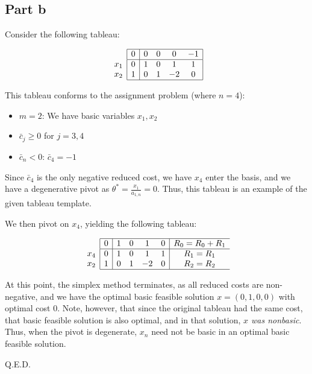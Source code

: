 \subsection*{Part b}

Consider the following tableau:

$$
\begin{array}{c}
\\
x_1 \\
x_2 \\ 
\end{array}
\begin{array}{|c|cccc|}
\hline
  0 & 0 & 0 & 0 & -1 \\ \hline
  0 & 1 & 0 & 1 & 1 \\
  1 & 0 & 1 & -2 & 0\\ \hline
\end{array}
$$


This tableau conforms to the assignment problem (where $n=4$):
\begin{itemize}
\item $m=2$: We have basic variables $x_1, x_2$
\item $\bar{c}_j\geq 0$ for $j=3, 4$
\item $\bar{c}_n<0$: $\bar{c}_4=-1$
\end{itemize}
Since $\bar{c}_4$ is the only negative reduced cost, we have $x_4$ enter the basis, and we have a degenerative pivot as $\theta^*=\frac{x_1}{a_{1,n}}=0$. Thus, this tableau is an example of the given tableau template.

We then pivot on $x_4$, yielding the following tableau:

$$
\begin{array}{c}
\\
x_4 \\
x_2 \\ 
\end{array}
\begin{array}{|c|cccc|c}
\hline
  0 & 1 & 0 & 1 & 0 & R_0=R_0+R_1\\ \hline
  0 & 1 & 0 & 1 & 1 & R_1=R_1\\
  1 & 0 & 1 & -2 & 0 & R_2=R_2\\ \hline
\end{array}
$$

At this point, the simplex method terminates, as all reduced costs are non-negative, and we have the optimal basic feasible solution $x=(0, 1, 0, 0)$ with optimal cost $0$. Note, however, that since the original tableau had the same cost, that basic feasible solution is also optimal, and in that solution, \textit{$x$ was nonbasic}. Thus, when the pivot is degenerate, $x_n$ need not be basic in an optimal basic feasible solution.

Q.E.D.
